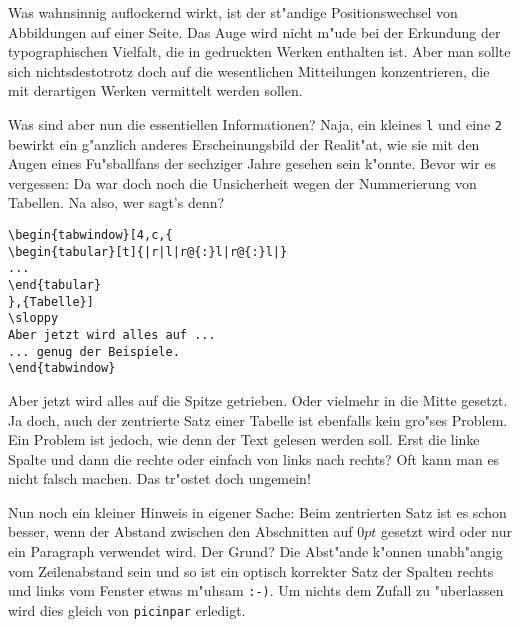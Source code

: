 Was wahnsinnig auflockernd wirkt, ist der st"andige Positionswechsel
von Abbildungen auf einer Seite. Das Auge wird nicht m"ude bei
der Erkundung der typographischen Vielfalt, die in gedruckten
Werken enthalten ist. Aber man sollte sich nichtsdestotrotz doch
auf die wesentlichen Mitteilungen konzentrieren, die mit derartigen
Werken vermittelt werden sollen.

Was sind aber nun die essentiellen Informationen? Naja, ein kleines
{\tt l} und eine {\tt 2} bewirkt ein g"anzlich anderes Erscheinungsbild
der Realit"at, wie sie mit den Augen eines Fu"sballfans der sechziger
Jahre gesehen sein k"onnte. Bevor wir es vergessen: Da war doch noch
die Unsicherheit wegen der Nummerierung von Tabellen. Na also, wer
sagt's denn?
\end{tabwindow}

\begin{verbatim}
\begin{tabwindow}[4,c,{
\begin{tabular}[t]{|r|l|r@{:}l|r@{:}l|}
...
\end{tabular}
},{Tabelle}]
\sloppy
Aber jetzt wird alles auf ...
... genug der Beispiele.
\end{tabwindow}
\end{verbatim}

\sloppy
Aber jetzt wird alles auf die Spitze getrieben. Oder vielmehr
in die Mitte gesetzt. Ja doch, auch der zentrierte Satz einer Tabelle
ist ebenfalls kein gro"ses Problem. Ein Problem ist jedoch, wie denn
der Text gelesen werden soll. Erst die linke Spalte und dann die
rechte oder einfach von links nach rechts? Oft kann man es nicht
falsch machen. Das tr"ostet doch ungemein!

Nun noch ein kleiner Hinweis in eigener Sache:
Beim zentrierten Satz ist es schon besser, wenn der Abstand zwischen
den Abschnitten auf $0pt$ gesetzt wird oder nur ein Paragraph verwendet
wird. Der Grund? Die Abst"ande k"onnen unabh"angig vom Zeilenabstand
sein und so ist ein optisch korrekter Satz der Spalten rechts und
links vom Fenster etwas m"uhsam {\tt :-)}. Um nichts dem Zufall zu
"uberlassen wird dies gleich von {\tt picinpar} erledigt.
\end{tabwindow}

